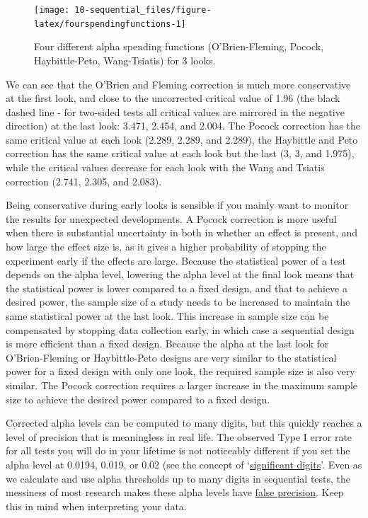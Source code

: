 \documentclass[
  oneside]{book}
\begin{document}
\begin{figure}

{\centering \texttt{[image: 10-sequential\_files/figure-latex/fourspendingfunctions-1]} 

}

\caption{Four different alpha spending functions (O'Brien-Fleming, Pocock, Haybittle-Peto, Wang-Tsiatis) for 3 looks.}\label{fig:fourspendingfunctions}
\end{figure}

We can see that the O'Brien and Fleming correction is much more conservative at the first look, and close to the uncorrected critical value of 1.96 (the black dashed line - for two-sided tests all critical values are mirrored in the negative direction) at the last look: 3.471, 2.454, and 2.004. The Pocock correction has the same critical value at each look (2.289, 2.289, and 2.289), the Haybittle and Peto correction has the same critical value at each look but the last (3, 3, and 1.975), while the critical values decrease for each look with the Wang and Tsiatis correction (2.741, 2.305, and 2.083).

Being conservative during early looks is sensible if you mainly want to monitor the results for unexpected developments. A Pocock correction is more useful when there is substantial uncertainty in both in whether an effect is present, and how large the effect size is, as it gives a higher probability of stopping the experiment early if the effects are large. Because the statistical power of a test depends on the alpha level, lowering the alpha level at the final look means that the statistical power is lower compared to a fixed design, and that to achieve a desired power, the sample size of a study needs to be increased to maintain the same statistical power at the last look. This increase in sample size can be compensated by stopping data collection early, in which case a sequential design is more efficient than a fixed design. Because the alpha at the last look for O'Brien-Fleming or Haybittle-Peto designs are very similar to the statistical power for a fixed design with only one look, the required sample size is also very similar. The Pocock correction requires a larger increase in the maximum sample size to achieve the desired power compared to a fixed design.

Corrected alpha levels can be computed to many digits, but this quickly reaches a level of precision that is meaningless in real life. The observed Type I error rate for all tests you will do in your lifetime is not noticeably different if you set the alpha level at 0.0194, 0.019, or 0.02 (see the concept of `\href{https://en.wikipedia.org/wiki/Significant_figures}{significant digits}'. Even as we calculate and use alpha thresholds up to many digits in sequential tests, the messiness of most research makes these alpha levels have \href{https://en.wikipedia.org/wiki/False_precision}{false precision}. Keep this in mind when interpreting your data.
\end{document}
